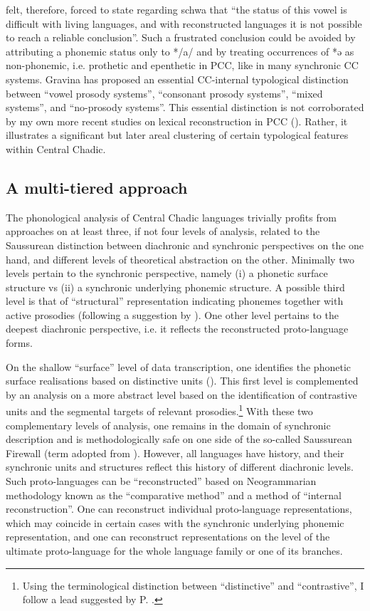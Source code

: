 \documentclass[output=paper]{langscibook}
\begin{document}
\citet[333]{Gravina2014} felt, therefore, forced to state regarding schwa that “the status of this vowel is difficult with living languages, and with reconstructed languages it is not possible to reach a reliable conclusion”. Such a frustrated conclusion could be avoided by attributing a phonemic status only to */a/ and by treating occurrences of *ə as non-phonemic, i.e. prothetic and epenthetic in PCC, like in many synchronic CC systems. Gravina has proposed an essential CC-internal typological distinction between ``vowel prosody systems'', ``consonant prosody systems'', ``mixed systems'', and ``no-prosody systems''. This essential distinction is not corroborated by my own more recent studies on lexical reconstruction in PCC (\citealt{Wolff2022a, Wolffinpressb}). Rather, it illustrates a significant but later areal clustering of certain typological features within Central Chadic.

\subsection{A multi-tiered approach}
\label{sec:Wolff:1.5}

The phonological analysis of Central Chadic languages trivially profits from approaches on at least three, if not four levels of analysis, related to the Saussurean distinction between diachronic and synchronic perspectives on the one hand, and different levels of theoretical abstraction on the other. Minimally two levels pertain to the synchronic perspective, namely (i) a phonetic surface structure vs (ii) a synchronic underlying phonemic structure. A possible third level is that of ``structural'' representation indicating phonemes together with active prosodies (following a suggestion by \citealt{Barreteau1983}). One other level pertains to the deepest diachronic perspective, i.e. it reflects the reconstructed proto-language forms.

On the shallow ``surface'' level of data transcription, one identifies the phonetic surface realisations based on distinctive units (). This first level is complemented by an analysis on a more abstract level based on the identification of contrastive units and the segmental targets of relevant prosodies.\footnote{Using the terminological distinction between ``distinctive'' and ``contrastive'', I follow a lead suggested by P. \citet{Kiparsky2015, Kiparsky2018}.}  With these two complementary levels of analysis, one remains in the domain of synchronic description and is methodologically safe on one side of the so-called Saussurean Firewall (term adopted from \citealt{Kiparsky2015}). However, all languages have history, and their synchronic units and structures reflect this history of different diachronic levels. Such proto-languages can be ``reconstructed'' based on Neogrammarian methodology known as the ``comparative method'' and a method of ``internal reconstruction''. One can reconstruct individual proto-language representations, which may coincide in certain cases with the synchronic underlying phonemic representation, and one can reconstruct representations on the level of the ultimate proto-language for the whole language family or one of its branches.
\end{document}
